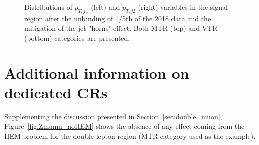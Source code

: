 \begin{figure}[htbp]
{    }
  \caption{Distributions of $p_{T,j1}$ (left) and $p_{T,j2}$ (right) variables in the signal region after the unbinding of 1/5th of the 2018 data and the mitigation of the jet "horns" effect. Both MTR (top) and VTR (bottom) categories are presented.}
  \label{fig:jet_eta_postHornCut_2018}
\end{figure}




\section{Additional information on dedicated CRs}
\label{app:CRs}
\hspace{10pt} Supplementing the discussion presented in Section~\ref{sec:double_muon}, Figure~\ref{fig:Zmumu_noHEM} shows the absence of any effect coming from the HEM problem for the double lepton region (MTR category used as the example).

